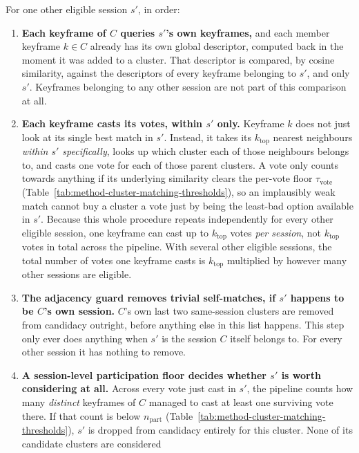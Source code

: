 For one other eligible session $s'$, in order:
\begin{enumerate}
  \item \textbf{Each keyframe of $C$ queries $s'$'s own keyframes,} and each member keyframe
    $k \in C$ already has its own global descriptor, computed back in
     the moment it was added to a cluster. That descriptor is
    compared, by cosine similarity, against the descriptors of every keyframe belonging to
    $s'$, and only $s'$. Keyframes belonging to any other session are not part of this
    comparison at all.
  \item \textbf{Each keyframe casts its votes, within $s'$ only.} Keyframe $k$ does not just
    look at its single best match in $s'$. Instead, it takes its $k_{\mathrm{top}}$ nearest neighbours
    \emph{within $s'$ specifically}, looks up which cluster each of those neighbours belongs
    to, and casts one vote for each of those parent clusters. A vote only counts towards
    anything if its underlying similarity clears the per-vote floor $\tau_{\mathrm{vote}}$
    (Table~\ref{tab:method-cluster-matching-thresholds}), so an implausibly weak match cannot
    buy a cluster a vote just by being the least-bad option available in $s'$. Because this
    whole procedure repeats independently for every other eligible session, one keyframe can
    cast up to $k_{\mathrm{top}}$ votes \emph{per session}, not $k_{\mathrm{top}}$ votes in
    total across the pipeline. With several other eligible sessions, the total number of votes
    one keyframe casts is $k_{\mathrm{top}}$ multiplied by however many other sessions are
    eligible.
  \item \textbf{The adjacency guard removes trivial self-matches, if $s'$ happens to be $C$'s
    own session.} $C$'s own last two same-session clusters are removed from candidacy outright,
    before anything else in this list happens. This step only ever does anything when $s'$ is
    the session $C$ itself belongs to. For every other session it has nothing to remove.
  \item \textbf{A session-level participation floor decides whether $s'$ is worth considering
    at all.} Across every vote just cast in $s'$, the pipeline counts how many \emph{distinct}
    keyframes of $C$ managed to cast at least one surviving vote there. If that count is below
    $n_{\mathrm{part}}$ (Table~\ref{tab:method-cluster-matching-thresholds}), $s'$ is dropped
    from candidacy entirely for this cluster. None of its candidate clusters are considered

\end{enumerate}
